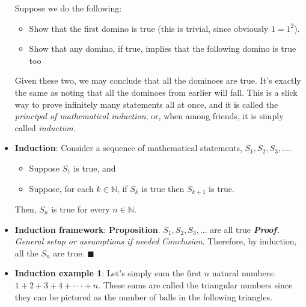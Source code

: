 \documentclass{report}
\begin{document}
\begin{itemize}
            \bigbreak \noindent 
            \bigbreak \noindent 
            Suppose we do the following:
            \begin{itemize}
                \item Show that the first domino is true (this is trivial, since obviously $1=1^{2} $).
                \item Show that any domino, if true, implies that the following domino is true too
            \end{itemize}
            Given these two, we may conclude that all the dominoes are true. It’s exactly the same as noting that all the dominoes from earlier will fall. This is a slick way to prove infinitely many statements all at once, and it is called the \textit{principal of mathematical induction}, or, when among friends, it is simply called \textit{induction}.
        \item \textbf{Induction}: Consider a sequence of mathematical statements, $S_{1}, S_{2}, S_{3}, . . . .$
            \begin{itemize}
                \item Suppose $S_{1}$ is true, and
                \item Suppose, for each $k \in \mathbb{N}$, if $S_{k}$ is true then $S_{k+1}$ is true.
            \end{itemize}
            Then, $S_{n} $ is true for every $n\in \mathbb{N}$.
        \item \textbf{Induction framework}:
            \bigbreak \noindent 
            \textbf{Proposition}. $S_{1}, S_{2}, S_{3},... $ are all true
            \bigbreak \noindent 
            \textbf{\textit{Proof.}} \textit{General setup or assumptions if needed}
            \textit{Conclusion}. Therefore, by induction, all the $S_{n}$ are true. \hspace{5cm} $\blacksquare $
        \item \textbf{Induction example 1}: Let’s simply sum the first $n$ natural numbers: $1 + 2 + 3 + 4 + · · · + n$. These sums are called the triangular numbers since they can be pictured as the number of balls in the following triangles.

\end{itemize}
\end{document}
